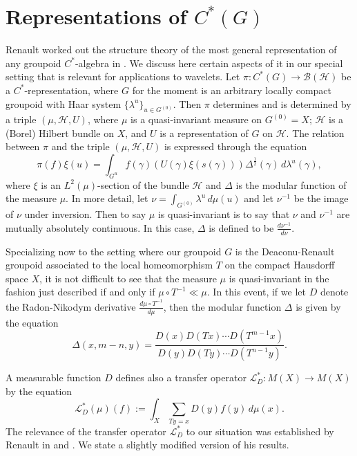 \documentclass{amsproc}
\theoremstyle{plain}
\theoremstyle{definition}
\theoremstyle{definition}
\theoremstyle{remark}
\theoremstyle{plain}
\begin{document}
\section{Representations of $C^{*}(G)$}

Renault worked out the structure theory of the most general representation
of any groupoid $C^{*}$-algebra in \cite{jR87}. We discuss here
certain aspects of it in our special setting that is relevant for
applications to wavelets. Let $\pi:C^{*}(G)\to\mathcal{B}(\mathcal{H})$
be a $C^{*}$-representation, where $G$ for the moment is an arbitrary
locally compact groupoid with Haar system $\{\lambda^{u}\}_{u\in G^{(0)}}$.
Then $\pi$ determines and is determined by a triple $(\mu,\mathcal{H},U)$,
where $\mu$ is a quasi-invariant measure on $G^{(0)}=X$; $\mathcal{H}$
is a (Borel) Hilbert bundle on $X$, and $U$ is a representation
of $G$ on $\mathcal{H}$. The relation between $\pi$ and the triple
$(\mu,\mathcal{H},U)$ is expressed through the equation \[
\pi(f)\xi(u)=\int_{G^{u}}f(\gamma)(U(\gamma)\xi(s(\gamma)))\Delta^{\frac{1}{2}}
(\gamma)\, d\lambda^{u}(\gamma),\]
where $\xi$ is an $L^{2}(\mu)$-section of the bundle $\mathcal{H}$
and $\Delta$ is the modular function of the measure $\mu.$ In more
detail, let $\nu=\int_{G^{(0)}}\lambda^{u}\, d\mu(u)$ and let $\nu^{-1}$
be the image of $\nu$ under inversion. Then to say $\mu$ is quasi-invariant
is to say that $\nu$ and $\nu^{-1}$ are mutually absolutely continuous.
In this case, $\Delta$ is defined to be $\frac{d\nu^{-1}}{d\nu}$. 

Specializing now to the setting where our groupoid $G$ is the Deaconu-Renault
groupoid associated to the local homeomorphism $T$ on the compact
Hausdorff space $X$, it is not difficult to see that the measure
$\mu$ is quasi-invariant in the fashion just described if and only
if $\mu\circ T^{-1}\ll\mu$. In this event, if we let $D$ denote
the Radon-Nikodym derivative $\frac{d\mu\circ T^{-1}}{d\mu}$, then
the modular function $\Delta$ is given by the equation \[
\Delta(x,m-n,y)=\frac{D(x)D(Tx)\cdots D(T^{m-1}x)}{D(y)D(Ty)\cdots
D(T^{n-1}y)}.\]


A measurable function $D$ defines also a transfer operator
$\mathcal{L}_{D}^{*}:M(X)\to M(X)$
by the equation\begin{equation}
\mathcal{L}_{D}^{*}(\mu)(f):=\int_{X}\sum_{Ty=x}D(y)f(y)\,
d\mu(x).\label{eq:Transfer}\end{equation}
The relevance of the transfer operator $\mathcal{L}_{D}^{*}$ to our
situation was established by Renault in \cite[Theorem 7.1]{jR05}
and \cite[Proposition 4.2]{jR03}. We state a slightly modified version
of his results.
\end{document}
